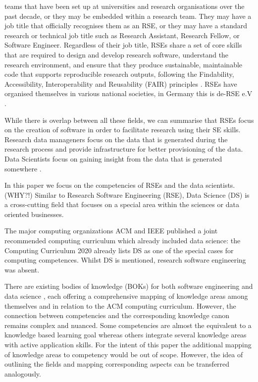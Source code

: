 \documentclass[
        english,biblatex
    ]{lni}
\begin{document}
\begin{itemize}
      teams that have been set up at universities and research
      organisations over the past decade, or they may be embedded within
      a research team. They may have a job title that officially
      recognises them as an RSE, or they may have a standard research or
      technical job title such as Research Assistant, Research Fellow,
      or Software Engineer. Regardless of their job title, RSEs share a
      set of core skills that are required to design and develop
      research software, understand the research environment, and ensure
      that they produce sustainable, maintainable code that supports
      reproducible research outputs, following the Findability,
      Accessibility, Interoperability and Reusability (FAIR) principles
      \cite{https://doi.org/10.12688/f1000research.157778.1}. RSEs have
      organised themselves in various national societies, in Germany
      this is de-RSE e.V \cite{derseev}.
    \end{itemize}

    While there is overlap between all these fields, we can summarise
    that RSEs focus on the creation of software in order to facilitate
    research using their SE skills. Research data manageners focus on
    the data that is generated during the research process and provide
    infrastructure for better provisioning of the data. Data Scientists
    focus on gaining insight from the data that is generated somewhere .

    In this paper we focus on the competencies of RSEs and the data
    scientists. (WHY?!) Similar to Research Software Engineering (RSE),
    Data Science (DS) is a cross-cutting field that focuses on a special
    area within the sciences or data oriented businesses.

    The major computing organizations ACM and IEEE published a joint
    recommended computing curriculum which already included data
    science: the Computing Curriculum 2020 \autocite{CC2020} already
    lists DS as one of the special cases for computing competences.
    Whilst DS is mentioned, research software engineering was absent.

    There are existing bodies of knowledge (BOKs) for both software
    engineering \autocite{SWEBOK2014} and data science
    \autocite{DSBOK2017}, each offering a comprehensive mapping of
    knowledge areas among themselves and in relation to the ACM
    computing curriculum. However, the connection between competencies
    and the corresponding knowledge canon remains complex and nuanced.
    Some competencies are almost the equivalent to a knowledge based
    learning goal whereas others integrate several knowledge areas with
    active application skills. For the intent of this paper the
    additional mapping of knowledge areas to competency would be out of
    scope. However, the idea of outlining the fields and mapping
    corresponding aspects can be transferred analogously.
\end{document}
